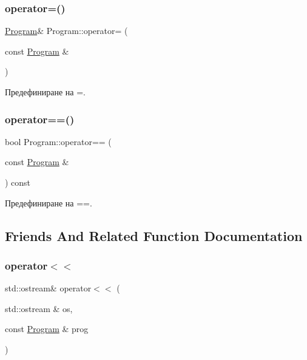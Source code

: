 \subsubsection{\texorpdfstring{operator=()}{operator=()}}
{\footnotesize\ttfamily \hyperlink{class_program}{Program}\& Program\+::operator= (\begin{DoxyParamCaption}\item[{const \hyperlink{class_program}{Program} \&}]{ }\end{DoxyParamCaption})}



Предефиниране на =. 

\mbox{\label{class_program_a3f5e4bab9e69d241abe952e17eaca44d}} 
\subsubsection{\texorpdfstring{operator==()}{operator==()}}
{\footnotesize\ttfamily bool Program\+::operator== (\begin{DoxyParamCaption}\item[{const \hyperlink{class_program}{Program} \&}]{ }\end{DoxyParamCaption}) const}



Предефиниране на ==. 



\subsection{Friends And Related Function Documentation}
\mbox{\label{class_program_a1a2195b7c83054fb960d60b48bca35b0}} 
\subsubsection{\texorpdfstring{operator$<$$<$}{operator<<}}
{\footnotesize\ttfamily std\+::ostream\& operator$<$$<$ (\begin{DoxyParamCaption}\item[{std\+::ostream \&}]{os,  }\item[{const \hyperlink{class_program}{Program} \&}]{prog }\end{DoxyParamCaption})\hspace{0.3cm}{\ttfamily [friend]}}

